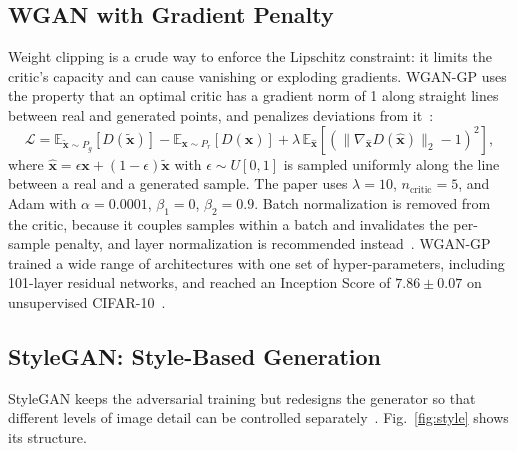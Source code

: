 \documentclass[conference]{IEEEtran}
\newcommand{\E}{\mathbb{E}}
\begin{document}
\subsection{WGAN with Gradient Penalty}
Weight clipping is a crude way to enforce the Lipschitz constraint: it limits the critic's capacity and can cause vanishing or exploding gradients. WGAN-GP uses the property that an optimal critic has a gradient norm of 1 along straight lines between real and generated points, and penalizes deviations from it~\cite{gulrajani2017}:
\begin{equation}
\mathcal{L}=\E_{\tilde{\mathbf{x}}\sim P_g}[D(\tilde{\mathbf{x}})]-\E_{\mathbf{x}\sim P_r}[D(\mathbf{x})]+\lambda\,\E_{\hat{\mathbf{x}}}\!\left[\left(\|\nabla_{\hat{\mathbf{x}}}D(\hat{\mathbf{x}})\|_2-1\right)^2\right],
\end{equation}
where $\hat{\mathbf{x}}=\epsilon\mathbf{x}+(1-\epsilon)\tilde{\mathbf{x}}$ with $\epsilon\sim U[0,1]$ is sampled uniformly along the line between a real and a generated sample. The paper uses $\lambda=10$, $n_{\mathrm{critic}}=5$, and Adam with $\alpha=0.0001$, $\beta_1=0$, $\beta_2=0.9$. Batch normalization is removed from the critic, because it couples samples within a batch and invalidates the per-sample penalty, and layer normalization is recommended instead~\cite{gulrajani2017}. WGAN-GP trained a wide range of architectures with one set of hyper-parameters, including 101-layer residual networks, and reached an Inception Score of $7.86\pm0.07$ on unsupervised CIFAR-10~\cite{gulrajani2017}.

\subsection{StyleGAN: Style-Based Generation}
StyleGAN keeps the adversarial training but redesigns the generator so that different levels of image detail can be controlled separately~\cite{karras2019}. Fig.~\ref{fig:style} shows its structure.
\end{document}
